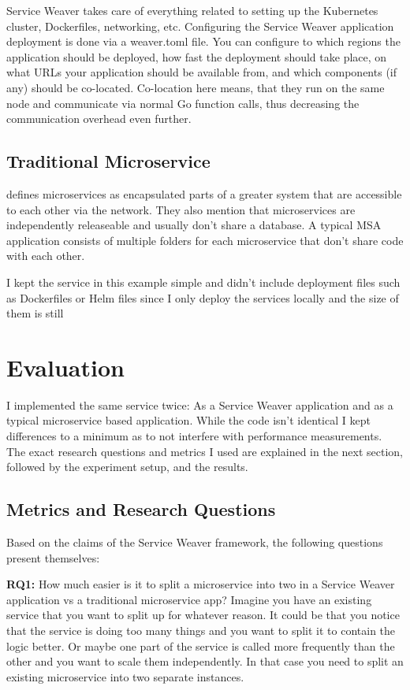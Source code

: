 \documentclass[sigconf,review,9pt]{acmart}
\begin{document}
Service Weaver takes care of everything related to setting up the Kubernetes cluster,
Dockerfiles, networking, etc.
Configuring the Service Weaver application deployment is done via a weaver.toml file.
You can configure to which regions the application should be deployed, how fast the
deployment should take place, on what URLs your application should be available from,
and which components (if any) should be co-located.
Co-location here means, that they run on the same node and communicate via normal
Go function calls, thus decreasing the communication overhead even further.

\subsection{Traditional Microservice}

 defines microservices as encapsulated parts
of a greater system that are accessible to each other via the network.
They also mention that microservices are independently releaseable and usually
don't share a database.
A typical MSA application consists of multiple folders for each microservice
that don't share code with each other.

I kept the service in this example simple and didn't include deployment files
such as Dockerfiles or Helm files since I only deploy the services locally and
the size of them is still

\section{Evaluation}

I implemented the same service twice: As a Service Weaver application and as a typical
microservice based application.
While the code isn't identical I kept differences to a minimum as to not interfere
with performance measurements.
The exact research questions and metrics I used are explained in the next section,
followed by the experiment setup, and the results.

\subsection{Metrics and Research Questions}
Based on the claims of the Service Weaver framework, the following questions
present themselves:

\textbf{RQ1:} How much easier is it to split a microservice into two in a Service Weaver
application vs a traditional microservice app?
Imagine you have an existing service that you want to split up for whatever
reason.
It could be that you notice that the service is doing too many things
and you want to split it to contain the logic better.
Or maybe one part of the service is called more frequently than the other
and you want to scale them independently.
In that case you need to split an existing microservice into two separate
instances.
\end{document}
